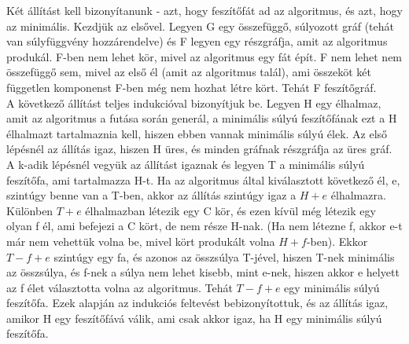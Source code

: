 \begin{bizonyitas}{}
Két állítást kell bizonyítanunk - azt, hogy feszítőfát ad az algoritmus, és azt, hogy az minimális. Kezdjük az elsővel. Legyen G egy összefüggő, súlyozott gráf (tehát van súlyfüggvény hozzárendelve) és F legyen egy részgráfja, amit az algoritmus produkál. F-ben nem lehet kör, mivel az algoritmus egy fát épít. F nem lehet nem összefüggő sem, mivel az első él (amit az algoritmus talál), ami összeköt két független komponenst F-ben még nem hozhat létre kört. Tehát F feszítőgráf.
\\
A következő állítást teljes indukcióval bizonyítjuk be. Legyen H egy élhalmaz, amit az algoritmus a futása során generál, a minimális súlyú feszítőfának ezt a H élhalmazt tartalmaznia kell, hiszen ebben vannak minimális súlyú élek.
Az első lépésnél az állítás igaz, hiszen H üres, és minden gráfnak részgráfja az üres gráf. A k-adik lépésnél vegyük az állítást igaznak és legyen T a minimális súlyú feszítőfa, ami tartalmazza H-t. Ha az algoritmus által kiválasztott következő él, e, szintúgy benne van a T-ben, akkor az állítás szintúgy igaz a $H + {e}$ élhalmazra. Különben $T + {e}$ élhalmazban létezik egy C kör, és ezen kívül még létezik egy olyan f él, ami befejezi a C kört, de nem része H-nak. (Ha nem létezne f, akkor e-t már nem vehettük volna be, mivel kört produkált volna $H + f$-ben). Ekkor $T - {f} + {e}$ szintúgy egy fa, és azonos az összsúlya T-jével, hiszen T-nek minimális az összsúlya, és f-nek a súlya nem lehet kisebb, mint e-nek, hiszen akkor e helyett az f élet választotta volna az algoritmus. Tehát $T - {f} + {e}$ egy minimális súlyú feszítőfa. Ezek alapján az indukciós feltevést bebizonyítottuk, és az állítás igaz, amikor H egy feszítőfává válik, ami csak akkor igaz, ha H egy minimális súlyú feszítőfa.
\end{bizonyitas}
